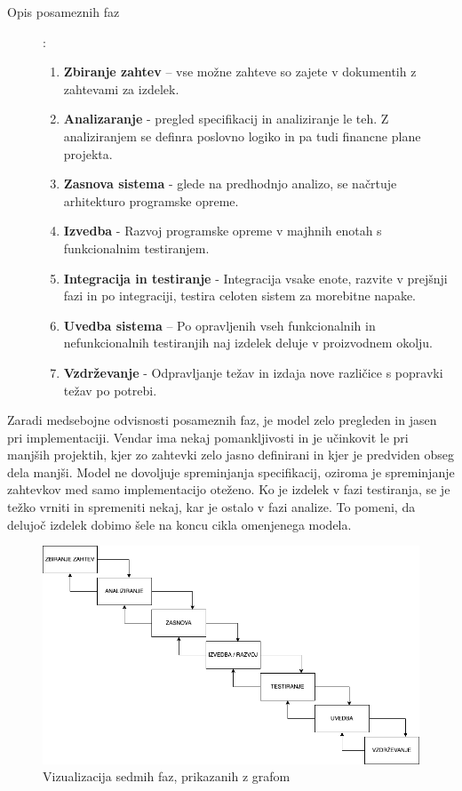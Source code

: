 \documentclass[a4paper, 12pt]{book}
\begin{document}
\begin{description}
    \item[Opis posameznih faz]:
    \begin{enumerate}
        \item \textbf{Zbiranje zahtev} – vse možne zahteve so zajete v dokumentih z zahtevami  za izdelek.
        \item \textbf{Analizaranje} - pregled specifikacij in analiziranje le teh. Z analiziranjem se definra poslovno logiko in pa tudi financne plane projekta.
        \item \textbf{Zasnova sistema} - glede na predhodnjo analizo, se načrtuje arhitekturo programske opreme.
        \item \textbf{Izvedba} - Razvoj programske opreme v majhnih enotah s funkcionalnim testiranjem.
        \item \textbf{Integracija in testiranje} - Integracija vsake enote, razvite v prejšnji fazi in po integraciji, testira celoten sistem za morebitne napake.
        \item \textbf{Uvedba sistema} – Po opravljenih vseh funkcionalnih in nefunkcionalnih testiranjih naj izdelek deluje v proizvodnem okolju.
        \item \textbf{Vzdrževanje} - Odpravljanje težav in izdaja nove različice s popravki težav po potrebi.
    \end{enumerate}
\end{description}

Zaradi medsebojne odvisnosti posameznih faz, je model zelo pregleden in jasen pri implementaciji. Vendar ima nekaj pomankljivosti in je učinkovit le pri manjših projektih, kjer zo zahtevki zelo jasno definirani in kjer je predviden obseg dela manjši.
Model ne dovoljuje spreminjanja specifikacij, oziroma je spreminjanje zahtevkov med samo implementacijo oteženo. Ko je izdelek v fazi testiranja, se je težko vrniti in spremeniti nekaj, kar je ostalo v fazi analize.
To pomeni, da delujoč izdelek dobimo šele na koncu cikla omenjenega modela. 

\begin{figure}[h]
\begin{center}
\includegraphics[width=1\textwidth]{slike/waterfall.png}
\end{center}
\caption{ Vizualizacija sedmih faz, prikazanih z grafom }
\label{waterfall-phases}
\end{figure}
\end{document}
